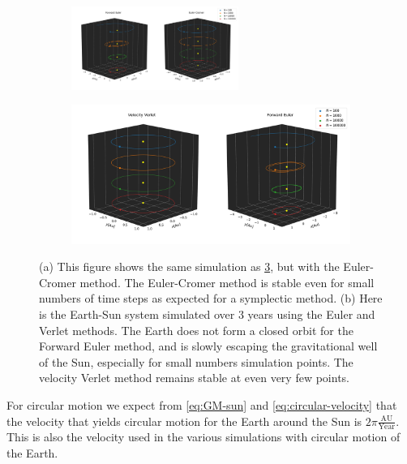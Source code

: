 \documentclass[../main.tex]{subfiles}
\begin{document}
\begin{figure}[htb!]
    \centering
    \begin{subfigure}[b]{\textwidth}
    \centering
    \includegraphics[trim=30cm 0.cm 0.cm 0.cm, clip,width=0.6\textwidth]{../figures/euler_vs_cromer.pdf}
    \caption{}
    \label{fig:earth-sun-cromer-vs-euler}
    \end{subfigure}
    
    \begin{subfigure}[b]{\textwidth}
    \includegraphics[trim=2cm 0.cm 0.cm 0.cm, clip,width=\textwidth]{../figures/stability.pdf}
    \caption{}
    \label{fig:earth-sun-verlet-vs-euler}
    \end{subfigure}
    \caption{(a) This figure shows the same simulation as \cref{fig:earth-sun-verlet-vs-euler}, but with the Euler-Cromer method. The Euler-Cromer method is stable even for small numbers of time steps as expected for a symplectic method. (b) Here is the Earth-Sun system simulated over 3 years using the Euler and Verlet methods. The Earth does not form a closed orbit for the Forward Euler method, and is slowly escaping the gravitational well of the Sun, especially for small numbers simulation points. The velocity Verlet method remains stable at even very few points. }
    
\end{figure}



For circular motion we expect from \cref{eq:GM-sun} and \cref{eq:circular-velocity} that the velocity that yields circular motion for the Earth around the Sun is $2 \pi \frac{\text{AU}}{\text{Year}}$. This is also the velocity used in the various simulations with circular motion of the Earth.
\end{document}

